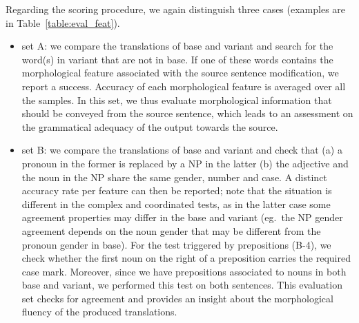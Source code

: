 \documentclass[11pt,letterpaper,final,nohyperref]{article}
\begin{document}
Regarding the scoring procedure, we again distinguish three cases (examples are in Table~\ref{table:eval_feat}).
\begin{itemize}
\item  set A: we compare the translations of base and variant and
search for the word(s) in variant that are not in base. If one of these words contains 
the morphological feature associated with the source sentence modification,
we report a success. Accuracy of each morphological feature is averaged over all the samples.
In this set, we thus evaluate morphological information that should be conveyed from the source sentence,
which leads to an assessment on the grammatical adequacy of the output towards the source. 

\item set B: we compare the translations of base and variant and check that (a) a pronoun in the former is replaced by a NP in the latter
(b) the adjective and the noun in the NP share the same gender, number and case.
A distinct accuracy rate per feature can then be reported;
note that the situation is different in the complex and coordinated tests, as in the latter case some agreement properties may differ in the base and variant (eg.\ the NP gender agreement depends on the noun gender that may be different from the pronoun gender in base).
For the test triggered by prepositions (B-4), we check whether the first noun on the right of a preposition
carries the required case mark. Moreover, since we have prepositions associated to nouns in both base and variant, we performed this test on both sentences.
This evaluation set checks for agreement and provides an insight about the morphological fluency of the produced translations.


\end{itemize}
\end{document}
